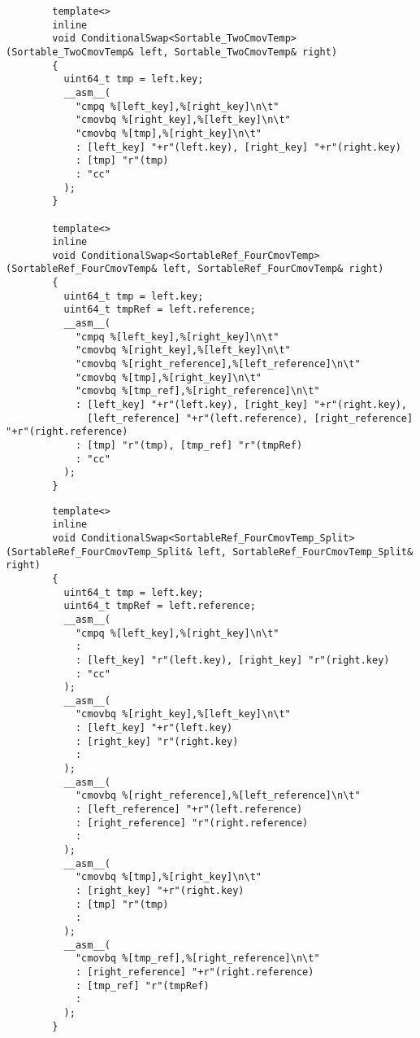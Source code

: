 \documentclass[12pt, a4paper]{article}
\begin{document}
	\pagebreak
	\begin{verbatim}
		template<>
		inline
		void ConditionalSwap<Sortable_TwoCmovTemp>(Sortable_TwoCmovTemp& left, Sortable_TwoCmovTemp& right)
		{
		  uint64_t tmp = left.key; 
		  __asm__( 
		    "cmpq %[left_key],%[right_key]\n\t" 
		    "cmovbq %[right_key],%[left_key]\n\t" 
		    "cmovbq %[tmp],%[right_key]\n\t"
		    : [left_key] "+r"(left.key), [right_key] "+r"(right.key)
		    : [tmp] "r"(tmp) 
		    : "cc" 
		  );
		}
		
		template<>
		inline
		void ConditionalSwap<SortableRef_FourCmovTemp>(SortableRef_FourCmovTemp& left, SortableRef_FourCmovTemp& right)
		{
		  uint64_t tmp = left.key;
		  uint64_t tmpRef = left.reference;
		  __asm__( 
		    "cmpq %[left_key],%[right_key]\n\t" 
		    "cmovbq %[right_key],%[left_key]\n\t" 
		    "cmovbq %[right_reference],%[left_reference]\n\t"
		    "cmovbq %[tmp],%[right_key]\n\t"
		    "cmovbq %[tmp_ref],%[right_reference]\n\t"
		    : [left_key] "+r"(left.key), [right_key] "+r"(right.key), 
		      [left_reference] "+r"(left.reference), [right_reference] "+r"(right.reference)
		    : [tmp] "r"(tmp), [tmp_ref] "r"(tmpRef)
		    : "cc" 
		  );
		}
	\end{verbatim}
	\pagebreak
	\begin{verbatim}
		template<>
		inline
		void ConditionalSwap<SortableRef_FourCmovTemp_Split>(SortableRef_FourCmovTemp_Split& left, SortableRef_FourCmovTemp_Split& right)
		{
		  uint64_t tmp = left.key;
		  uint64_t tmpRef = left.reference;
		  __asm__( 
		    "cmpq %[left_key],%[right_key]\n\t"
		    : 
		    : [left_key] "r"(left.key), [right_key] "r"(right.key)
		    : "cc" 
		  );
		  __asm__(
		    "cmovbq %[right_key],%[left_key]\n\t"
		    : [left_key] "+r"(left.key)
		    : [right_key] "r"(right.key)
		    : 
		  );
		  __asm__(
		    "cmovbq %[right_reference],%[left_reference]\n\t"
		    : [left_reference] "+r"(left.reference)
		    : [right_reference] "r"(right.reference)
		    :
		  );
		  __asm__(
		    "cmovbq %[tmp],%[right_key]\n\t"
		    : [right_key] "+r"(right.key)
		    : [tmp] "r"(tmp)
		    : 
		  );
		  __asm__(
		    "cmovbq %[tmp_ref],%[right_reference]\n\t"
		    : [right_reference] "+r"(right.reference)
		    : [tmp_ref] "r"(tmpRef)
		    : 
		  );
		}
	\end{verbatim}
	\pagebreak
\end{document}
